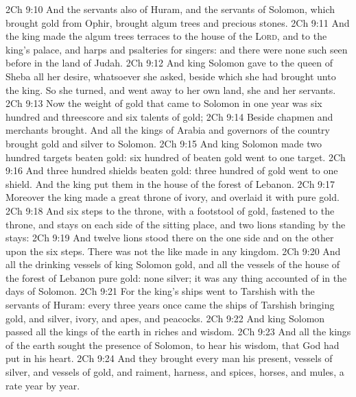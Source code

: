 \vs 2Ch 9:10 And the servants also of Huram, and the servants of Solomon, which brought gold from Ophir, brought algum trees and precious stones.
\vs 2Ch 9:11 And the king made  the algum trees terraces to the house of the \textsc{Lord}, and to the king's palace, and harps and psalteries for singers: and there were none such seen before in the land of Judah.
\vs 2Ch 9:12 And king Solomon gave to the queen of Sheba all her desire, whatsoever she asked, beside  which she had brought unto the king. So she turned, and went away to her own land, she and her servants.
\vs 2Ch 9:13 Now the weight of gold that came to Solomon in one year was six hundred and threescore and six talents of gold;
\vs 2Ch 9:14 Beside  chapmen and merchants brought. And all the kings of Arabia and governors of the country brought gold and silver to Solomon.
\vs 2Ch 9:15 And king Solomon made two hundred targets  beaten gold: six hundred  of beaten gold went to one target.
\vs 2Ch 9:16 And three hundred shields  beaten gold: three hundred  of gold went to one shield. And the king put them in the house of the forest of Lebanon.
\vs 2Ch 9:17 Moreover the king made a great throne of ivory, and overlaid it with pure gold.
\vs 2Ch 9:18 And  six steps to the throne, with a footstool of gold,  fastened to the throne, and stays on each side of the sitting place, and two lions standing by the stays:
\vs 2Ch 9:19 And twelve lions stood there on the one side and on the other upon the six steps. There was not the like made in any kingdom.
\vs 2Ch 9:20 And all the drinking vessels of king Solomon  gold, and all the vessels of the house of the forest of Lebanon  pure gold: none  silver; it was  any thing accounted of in the days of Solomon.
\vs 2Ch 9:21 For the king's ships went to Tarshish with the servants of Huram: every three years once came the ships of Tarshish bringing gold, and silver, ivory, and apes, and peacocks.
\vs 2Ch 9:22 And king Solomon passed all the kings of the earth in riches and wisdom.
\vs 2Ch 9:23 And all the kings of the earth sought the presence of Solomon, to hear his wisdom, that God had put in his heart.
\vs 2Ch 9:24 And they brought every man his present, vessels of silver, and vessels of gold, and raiment, harness, and spices, horses, and mules, a rate year by year.
